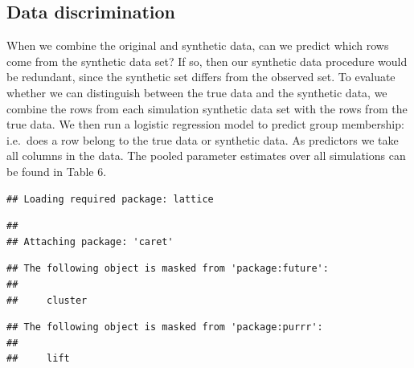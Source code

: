\documentclass[psych,article,submit,moreauthors,pdftex]{mdpi}
\begin{document}
\hypertarget{data-discrimination}{%
\subsection{Data discrimination}\label{data-discrimination}}

When we combine the original and synthetic data, can we predict which
rows come from the synthetic data set? If so, then our synthetic data
procedure would be redundant, since the synthetic set differs from the
observed set. To evaluate whether we can distinguish between the true
data and the synthetic data, we combine the rows from each simulation
synthetic data set with the rows from the true data. We then run a
logistic regression model to predict group membership: i.e.~does a row
belong to the true data or synthetic data. As predictors we take all
columns in the data. The pooled parameter estimates over all simulations
can be found in Table 6.

\begin{verbatim}
## Loading required package: lattice
\end{verbatim}

\begin{verbatim}
## 
## Attaching package: 'caret'
\end{verbatim}

\begin{verbatim}
## The following object is masked from 'package:future':
## 
##     cluster
\end{verbatim}

\begin{verbatim}
## The following object is masked from 'package:purrr':
## 
##     lift
\end{verbatim}
\end{document}
